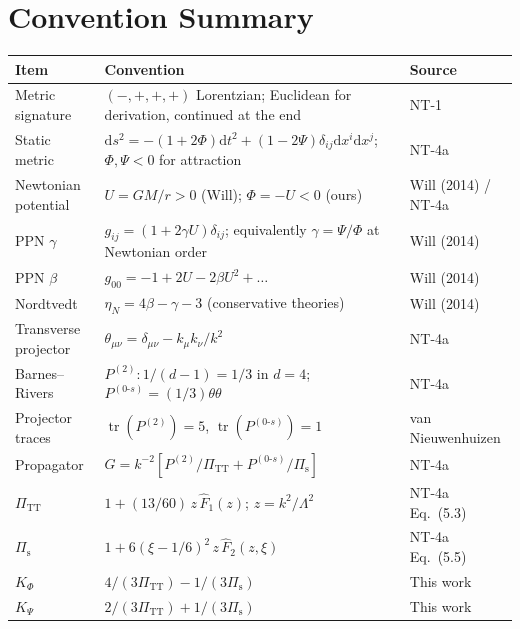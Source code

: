 \documentclass[11pt,a4paper]{article}
\theoremstyle{plain}
\theoremstyle{definition}
\theoremstyle{remark}
\newcommand{\tr}{\operatorname{tr}}
\newcommand{\dd}{\mathrm{d}}
\begin{document}
\section{Convention Summary}\label{sec:conventions-summary}

\begin{center}
\renewcommand{\arraystretch}{1.25}
\begin{longtable}{p{3.5cm}p{7cm}p{2.5cm}}
\toprule
\textbf{Item} & \textbf{Convention} & \textbf{Source} \\
\midrule
\endhead
Metric signature &
  $(-,+,+,+)$ Lorentzian; Euclidean for derivation,
  continued at the end &
  NT-1 \\
Static metric &
  $\dd s^2 = -(1+2\Phi)\dd t^2
  + (1-2\Psi)\delta_{ij}\dd x^i\dd x^j$;
  $\Phi,\Psi < 0$ for attraction &
  NT-4a \\
Newtonian potential &
  $U = GM/r > 0$ (Will); $\Phi = -U < 0$ (ours) &
  Will (2014) / NT-4a \\
PPN $\gamma$ &
  $g_{ij} = (1+2\gamma U)\delta_{ij}$; equivalently
  $\gamma = \Psi/\Phi$ at Newtonian order &
  Will (2014) \\
PPN $\beta$ &
  $g_{00} = -1+2U-2\beta U^2 + \ldots$ &
  Will (2014) \\
Nordtvedt &
  $\eta_N = 4\beta-\gamma-3$ (conservative theories) &
  Will (2014) \\
Transverse projector &
  $\theta_{\mu\nu} = \delta_{\mu\nu} - k_\mu k_\nu/k^2$ &
  NT-4a \\
Barnes--Rivers &
  $P^{(2)}: 1/(d-1) = 1/3$ in $d=4$;
  $P^{(0\text{-}s)} = (1/3)\theta\theta$ &
  NT-4a \\
Projector traces &
  $\tr(P^{(2)}) = 5$, $\tr(P^{(0\text{-}s)}) = 1$ &
  van Nieuwenhuizen \\
Propagator &
  $G = k^{-2}[P^{(2)}/\Pi_{\mathrm{TT}} +
  P^{(0\text{-}s)}/\Pi_{\mathrm{s}}]$ &
  NT-4a \\
$\Pi_{\mathrm{TT}}$ &
  $1 + (13/60)\,z\,\hat{F}_1(z)$; $z = k^2/\Lambda^2$ &
  NT-4a Eq.~(5.3) \\
$\Pi_{\mathrm{s}}$ &
  $1 + 6(\xi-1/6)^2\,z\,\hat{F}_2(z,\xi)$ &
  NT-4a Eq.~(5.5) \\
$K_\Phi$ &
  $4/(3\Pi_{\mathrm{TT}}) - 1/(3\Pi_{\mathrm{s}})$ &
  This work \\
$K_\Psi$ &
  $2/(3\Pi_{\mathrm{TT}}) + 1/(3\Pi_{\mathrm{s}})$ &
  This work \\

\end{longtable}
\end{center}
\end{document}
